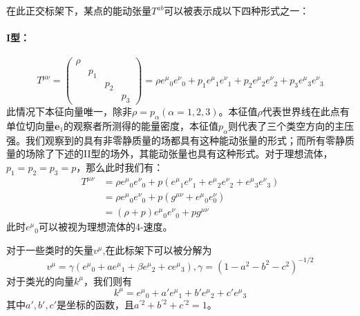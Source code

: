 \documentclass[hyperref, UTF8, a4paper]{ctexart}
\begin{document}
在此正交标架下，某点的能动张量$T^{ab}$可以被表示成以下四种形式之一：

\paragraph{I型：}
\begin{equation*}
	T^{\mu \nu } =\begin{pmatrix}
		\rho  &  &  & \\
		& p_{1} &  & \\
		&  & p_{2} & \\
		&  &  & p_{3}
	\end{pmatrix} =\rho e^{\mu }{}_{0} e^{\nu }{}_{0} +p_{1} e^{\mu }{}_{1} e^{\nu }{}_{1} +p_{2} e^{\mu }{}_{2} e^{\nu }{}_{2} +p_{3} e^{\mu }{}_{3} e^{\nu }{}_{3}
\end{equation*}
此情况下本征向量唯一，除非$\rho =p_{\alpha }( \alpha =1,2,3)$。本征值$\rho $代表世界线在此点有单位切向量$\boldsymbol{e}_{1}$的观察者所测得的能量密度，本征值$p_{\alpha }$则代表了三个类空方向的主压强。我们观察到的具有非零静质量的场都具有这种能动张量的形式；而所有零静质量的场除了下述的II型的场外，其能动张量也具有这种形式。对于理想流体，$p_{1} =p_{2} =p_{3} =p$，那么此时我们有：
\begin{equation*}
	\begin{aligned}
		T^{\mu \nu } & =\rho e^{\mu }{}_{0} e^{\nu }{}_{0} +p\left( e^{\mu }{}_{1} e^{\nu }{}_{1} +e^{\mu }{}_{2} e^{\nu }{}_{2} +e^{\mu }{}_{3} e^{\nu }{}_{3}\right)\\
		& =\rho e^{\mu }{}_{0} e^{\nu }{}_{0} +p\left( g^{\mu \nu } +e^{\mu }{}_{0} e_{0}^{\nu }\right)\\
		& =( \rho +p) e^{\mu }{}_{0} e^{\nu }{}_{0} +pg^{\mu \nu }
	\end{aligned}
\end{equation*}
此时$e^{\mu }{}_{0}$可以被视为理想流体的4-速度。

对于一些类时的矢量$v^{\mu }$,在此标架下可以被分解为
\begin{equation}
	v^{\mu } =\gamma \left( e^{\mu }{}_{0} +ae^{\mu }{}_{1} +\beta e^{\mu }{}_{2} +ce^{\mu }{}_{3}\right) ,\gamma =\left( 1-a^{2} -b^{2} -c^{2}\right)^{-1/2}
\end{equation}
对于类光的向量$k^{\mu }$，我们则有
\begin{equation*}
	k^{\mu } =e^{\mu }{}_{0} +a'e^{\mu }{}_{1} +b'e^{\mu }{}_{2} +c'e^{\mu }{}_{3}
\end{equation*}
其中$a',b',c'$是坐标的函数，且$a^{\prime 2} +b^{\prime 2} +c^{\prime 2} =1$。
\end{document}
